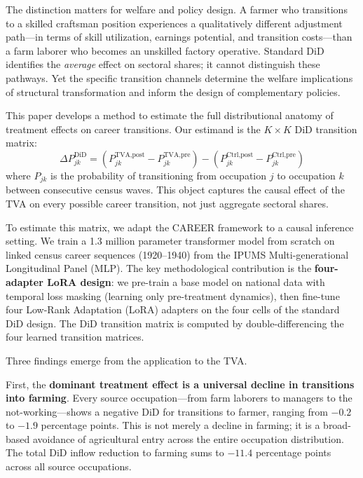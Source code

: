\documentclass[12pt]{article}
\begin{document}
The distinction matters for welfare and policy design. A farmer who transitions to a skilled craftsman position experiences a qualitatively different adjustment path---in terms of skill utilization, earnings potential, and transition costs---than a farm laborer who becomes an unskilled factory operative. Standard DiD identifies the \textit{average} effect on sectoral shares; it cannot distinguish these pathways. Yet the specific transition channels determine the welfare implications of structural transformation and inform the design of complementary policies.

This paper develops a method to estimate the full distributional anatomy of treatment effects on career transitions. Our estimand is the $K \times K$ DiD transition matrix:
\begin{equation}
\Delta P_{jk}^{\text{DiD}} = \left(P_{jk}^{\text{TVA,post}} - P_{jk}^{\text{TVA,pre}}\right) - \left(P_{jk}^{\text{Ctrl,post}} - P_{jk}^{\text{Ctrl,pre}}\right)
\label{eq:did_matrix}
\end{equation}
where $P_{jk}$ is the probability of transitioning from occupation $j$ to occupation $k$ between consecutive census waves. This object captures the causal effect of the TVA on every possible career transition, not just aggregate sectoral shares.

To estimate this matrix, we adapt the CAREER framework \citep{vafa2022} to a causal inference setting. We train a 1.3 million parameter transformer model \citep{vaswani2017} from scratch on linked census career sequences (1920--1940) from the IPUMS Multi-generational Longitudinal Panel (MLP). The key methodological contribution is the \textbf{four-adapter LoRA design}: we pre-train a base model on national data with temporal loss masking (learning only pre-treatment dynamics), then fine-tune four Low-Rank Adaptation (LoRA) adapters \citep{hu2022} on the four cells of the standard DiD design. The DiD transition matrix is computed by double-differencing the four learned transition matrices.

Three findings emerge from the application to the TVA.

First, the \textbf{dominant treatment effect is a universal decline in transitions into farming}. Every source occupation---from farm laborers to managers to the not-working---shows a negative DiD for transitions to farmer, ranging from $-0.2$ to $-1.9$ percentage points. This is not merely a decline in farming; it is a broad-based avoidance of agricultural entry across the entire occupation distribution. The total DiD inflow reduction to farming sums to $-11.4$ percentage points across all source occupations.
\end{document}

